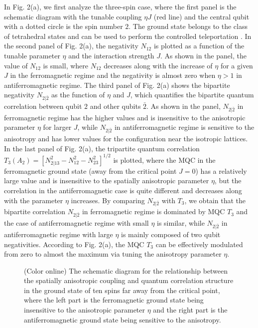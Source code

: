 \documentclass[pra,aps,twocolumn,showpacs]{revtex4}
\begin{document}
In Fig. 2(a), we first analyze the three-spin case, where the first panel is the schematic diagram with the tunable coupling $\eta J$ (red line) and the central qubit with a dotted circle is the spin number $2$. The ground state belongs to the class of tetrahedral states \cite{Carteret00jpa,Brun01pla} and can be used to perform the controlled teleportation \cite{Li14pra}. In the second panel of Fig. 2(a), the negativity $N_{12}$ is plotted as a function of the tunable parameter $\eta$ and the interaction strength $J$. As shown in the panel, the value of $N_{12}$ is small, where $N_{12}$ decreases along with the increase of $\eta$ for a given $J$ in the ferromagnetic regime and the negativity is almost zero when $\eta>1$ in antiferromagnetic regime. The third panel of Fig. 2(a) shows the bipartite negativity $N_{2|\bar{2}}$ as the function of $\eta$ and $J$, which quantifies the bipartite quantum correlation between qubit $2$ and other qubits $\bar{2}$. As shown in the panel, $N_{2|\bar{2}}$ in ferromagnetic regime has the higher values and is insensitive to the anisotropic parameter $\eta$ for larger $J$, while $N_{2|\bar{2}}$ in antiferromagnetic regime is sensitive to the anisotropy and has lower values for the configuration near the isotropic lattices. In the last panel of Fig. 2(a), the tripartite quantum correlation $T_{3}(A_2)=[ N_{2|13}^{2}-N_{12}^{2}-N_{23}^{2}] ^{1/2}$ is plotted, where the MQC in the ferromagnetic ground state (away from the critical point $J=0$) has a relatively large value and is insensitive to the spatially anisotropic parameter $\eta$, but the correlation in the antiferromagnetic case is quite different and decreases along with the parameter $\eta$ increases. By comparing $N_{2|\bar{2}}$ with $T_{3}$, we obtain that the bipartite correlation $N_{2|\bar{2}}$ in ferromagnetic regime is dominated by MQC $T_3$ and the case of antiferromagnetic regime with small $\eta$ is similar, while $N_{2|\bar{2}}$ in antiferromagnetic regime with large $\eta$ is mainly composed of two qubit negativities. According to Fig. 2(a), the MQC $T_{3}$ can be effectively modulated from zero to almost the maximum via tuning the anisotropy parameter $\eta$.

\begin{figure}
	\caption{(Color online) The schematic diagram for the relationship between the spatially anisotropic coupling and quantum correlation structure in the ground state of ten spins far away from the critical point, where the left part is the ferromagnetic ground state being insensitive to the anisotropic parameter $\eta$ and the right part is the antiferromagnetic ground state being sensitive to the anisotropy.}
\end{figure}
\end{document}
